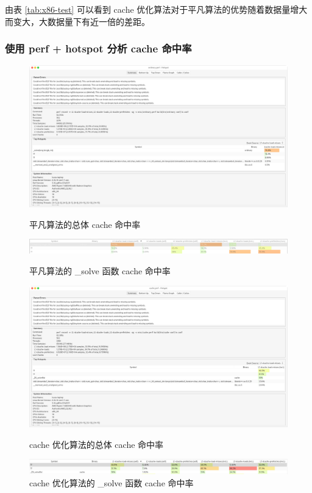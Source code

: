 \documentclass[a4paper]{article}
\begin{document}
由表 \ref{tab:x86-test} 可以看到 cache 优化算法对于平凡算法的优势随着数据量增大而变大，大数据量下有近一倍的差距。

\subsubsection{使用 perf + hotspot 分析 cache 命中率}
\begin{figure}[H]
  \centering
  \includegraphics[width=\textwidth]{perf-ord-hotspot-1.png}
  \caption{平凡算法的总体 cache 命中率}
  \label{pic:ord1}

  \centering
  \includegraphics[width=\textwidth]{perf-ord-hotspot-2.png}
  \caption{平凡算法的 _solve 函数 cache 命中率}
  \label{pic:ord2}

  \centering
  \includegraphics[width=\textwidth]{perf-cache-hotspot-1.png}
  \caption{cache 优化算法的总体 cache 命中率}
  \label{pic:cache1}

  \centering
  \includegraphics[width=\textwidth]{perf-cache-hotspot-2.png}
  \caption{cache 优化算法的 _solve 函数 cache 命中率}
  \label{pic:cache2}
\end{figure}
\end{document}
